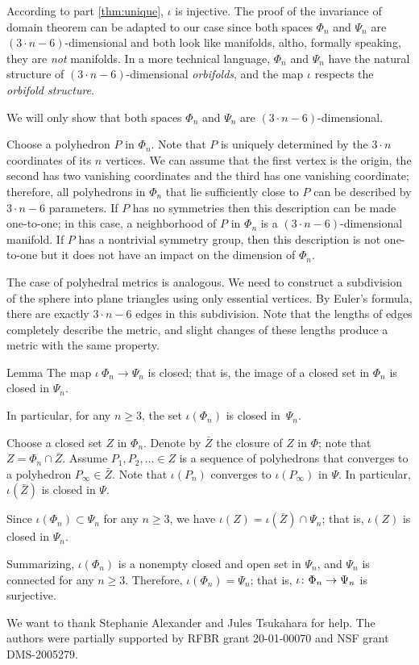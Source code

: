 \documentclass[oneside,a4paper]{article}
\begin{document}
According to part \ref{thm:unique}, $\iota$ is injective.
The proof of the invariance of domain theorem can be adapted to our case since both spaces $\Phi_n$ and $\Psi_n$ are $(3\cdot n-6)$-dimensional and both look like manifolds, altho, formally speaking, they are \emph{not} manifolds.
In a more technical language, $\Phi_n$ and $\Psi_n$ have the natural structure of $(3\cdot n-6)$-dimensional \emph{orbifolds},
and the map $\iota$ respects the \emph{orbifold structure}.

We will only show that both spaces $\Phi_n$ and $\Psi_n$ are $(3\cdot n-6)$-dimensional.

Choose a polyhedron $P$ in $\Phi_n$.
Note that $P$ is uniquely determined by the $3\cdot n$ coordinates of its $n$ vertices.
We can assume that the first vertex is the origin, the second has two vanishing coordinates and the third has one vanishing coordinate; therefore, all polyhedrons in $\Phi_n$ that lie sufficiently close to $P$ can be described by $3\cdot n-6$ parameters.
If $P$ has no symmetries then this description can be made one-to-one;
in this case, a neighborhood of $P$ in $\Phi_n$ is a $(3\cdot n-6)$-dimensional manifold.
If $P$ has a nontrivial symmetry group, then this description is not one-to-one but it does not have an impact on the dimension of $\Phi_n$.

The case of polyhedral metrics is analogous.
We need to construct a subdivision of the sphere into plane triangles using only essential vertices.
By Euler's formula, there are exactly $3\cdot n-6$ edges in this subdivision.
Note that the lengths of edges completely describe the metric, and slight changes of these lengths produce a metric with the same property.

\begin{thm}{Lemma}
The map $\iota\:\Phi_n\to\Psi_n$ is closed;
that is, the image of a closed set in $\Phi_n$ is closed in $\Psi_n$.

In particular, for any $n\ge 3$, the set $\iota(\Phi_n)$ is closed in~$\Psi_n$.
\end{thm}

Choose a closed set $Z$ in $\Phi_n$.
Denote by $\bar Z$ the closure of $Z$ in $\Phi$; note that $Z=\Phi_n\cap \bar Z$.
Assume $P_1,P_2,\dots\in Z$ is a sequence of polyhedrons that converges to a polyhedron $P_\infty\in\bar Z$.
Note that $\iota(P_n)$ converges to $\iota(P_\infty)$ in $\Psi$.
In particular, $\iota(\bar Z)$ is closed in $\Psi$.

Since $\iota(\Phi_n)\subset \Psi_n$ for any $n\ge 3$, we have  $\iota (Z)=\iota(\bar Z)\cap \Psi_n$;
that is, $\iota (Z)$ is closed in $\Psi_n$. 

\medskip

Summarizing, $\iota(\Phi_n)$ is a nonempty closed and open set in $\Psi_n$, and $\Psi_n$ is connected for any $n\ge 3$.
Therefore, $\iota(\Phi_n)=\Psi_n$; that is, $\iota\:\Phi_n\z\to\Psi_n$ is surjective.
\qeds

 We want to thank Stephanie Alexander and Jules Tsukahara for help.
The authors were partially supported by RFBR grant 20-01-00070 and NSF grant DMS-2005279.

\sloppy
\printbibliography[heading=bibintoc]
\fussy
\end{document}
